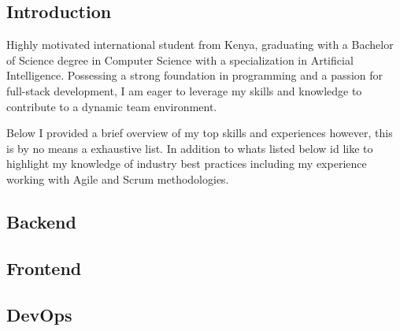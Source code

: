 \documentclass{modernsimplecv}
\newlength{\rightcolwidth}
\newlength{\leftcolwidth}
\begin{document}
\begin{paracol}{2}
{\begin{minipage}[t]{\leftcolwidth}
\vspace{4em}
\end{minipage}
}
\switchcolumn

\section{Introduction} 
{\small
Highly motivated international student from Kenya, graduating with a Bachelor of Science degree in Computer Science with a specialization in Artificial Intelligence. Possessing a strong foundation in programming and a passion for full-stack development, I am eager to leverage my skills and knowledge to contribute to a dynamic team environment.

\hfill \break
Below I provided  a brief overview of my top skills and experiences however, this is by no means a exhaustive list. In addition to whats listed below id like to highlight my knowledge of industry best practices including my experience working with Agile and Scrum methodologies.}
\bigskip


\subsection*{Backend}

\begin{skillsection}{\rightcolwidth}
\end{skillsection}

\subsection*{Frontend}

\begin{skillsection}{\rightcolwidth}
\end{skillsection}

\subsection*{DevOps}

\begin{skillsection}{\rightcolwidth}
\end{skillsection}


\end{paracol}
\end{document}
